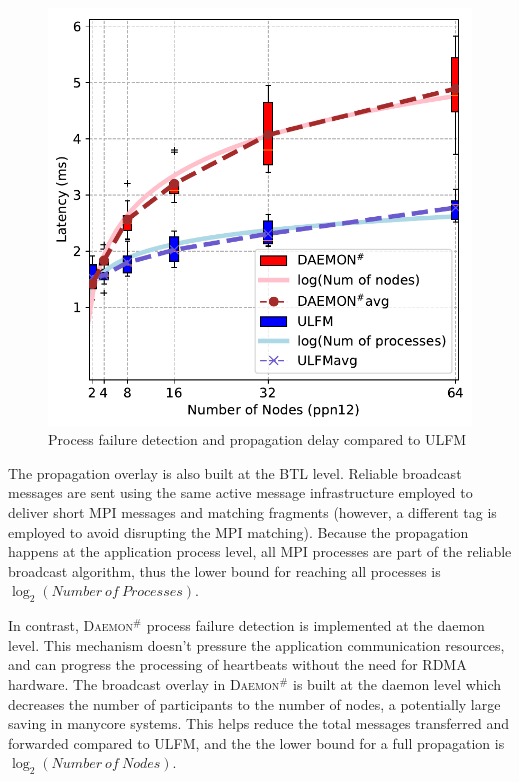 \documentclass[sigconf]{acmart}
\newcommand{\ulfm}[0]{\textsc{ULFM}\xspace}
\newcommand{\mpi}[0]{\textsc{MPI}\xspace}
\newcommand{\ourwork}[0]{\textsc{Daemon}\ensuremath{^\#}\xspace}
\begin{document}
\begin{figure}[h]
  \centering
  \includegraphics[width=\linewidth]{Process_Failure_log_fit.pdf}
  \caption{Process failure detection and propagation delay compared to \ulfm}
  \label{fig:proc_failure_nacl}
\end{figure}

The propagation overlay is also built at the BTL level. Reliable broadcast 
messages are sent using the same active message infrastructure employed to 
deliver short \mpi messages and matching fragments (however, a different 
tag is employed to avoid disrupting the \mpi matching). Because the 
propagation happens at the application process level, all \mpi processes 
are part of the reliable broadcast algorithm, thus the lower bound for reaching 
all processes is $\log_2({Number\ of\ Processes})$.  

In contrast, \ourwork process failure detection is implemented at the daemon
level. This mechanism doesn't pressure the application communication resources, 
and can progress the processing of heartbeats without the need for 
RDMA hardware. The broadcast overlay in \ourwork is built at the daemon
level which decreases the number of participants to the number of nodes, a potentially 
large saving in manycore systems. This helps reduce 
the total messages transferred and forwarded compared to \ulfm, and the 
 the lower bound for a full propagation is $\log_2({Number\ of\ Nodes})$.
\end{document}
